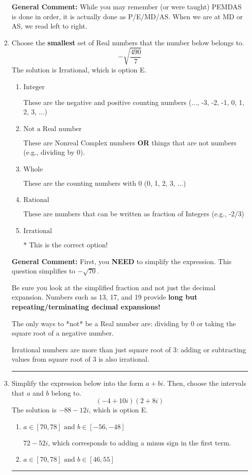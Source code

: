 \documentclass{extbook}[14pt]
\newcommand{\litem}[1]{\item #1

\rule{\textwidth}{0.4pt}}
\begin{document}
\begin{enumerate}
{\textbf{General Comment:} While you may remember (or were taught) PEMDAS is done in order, it is actually done as P/E/MD/AS. When we are at MD or AS, we read left to right.
}
\litem{
Choose the \textbf{smallest} set of Real numbers that the number below belongs to.
\[ -\sqrt{\frac{490}{7}} \]
The solution is \( \text{Irrational} \), which is option E.\begin{enumerate}[label=\Alph*.]
\item \( \text{Integer} \)

These are the negative and positive counting numbers (..., -3, -2, -1, 0, 1, 2, 3, ...)
\item \( \text{Not a Real number} \)

These are Nonreal Complex numbers \textbf{OR} things that are not numbers (e.g., dividing by 0).
\item \( \text{Whole} \)

These are the counting numbers with 0 (0, 1, 2, 3, ...)
\item \( \text{Rational} \)

These are numbers that can be written as fraction of Integers (e.g., -2/3)
\item \( \text{Irrational} \)

* This is the correct option!
\end{enumerate}

\textbf{General Comment:} First, you \textbf{NEED} to simplify the expression. This question simplifies to $-\sqrt{70}$. 
 
 Be sure you look at the simplified fraction and not just the decimal expansion. Numbers such as 13, 17, and 19 provide \textbf{long but repeating/terminating decimal expansions!} 
 
 The only ways to *not* be a Real number are: dividing by 0 or taking the square root of a negative number. 
 
 Irrational numbers are more than just square root of 3: adding or subtracting values from square root of 3 is also irrational.
}
\litem{
Simplify the expression below into the form $a+bi$. Then, choose the intervals that $a$ and $b$ belong to.
\[ (-4 + 10 i)(2 + 8 i) \]
The solution is \( -88 - 12 i \), which is option E.\begin{enumerate}[label=\Alph*.]
\item \( a \in [70, 78] \text{ and } b \in [-56, -48] \)

 $72 - 52 i$, which corresponds to adding a minus sign in the first term.
\item \( a \in [70, 78] \text{ and } b \in [46, 55] \)


\end{enumerate}}
\end{enumerate}
\end{document}
